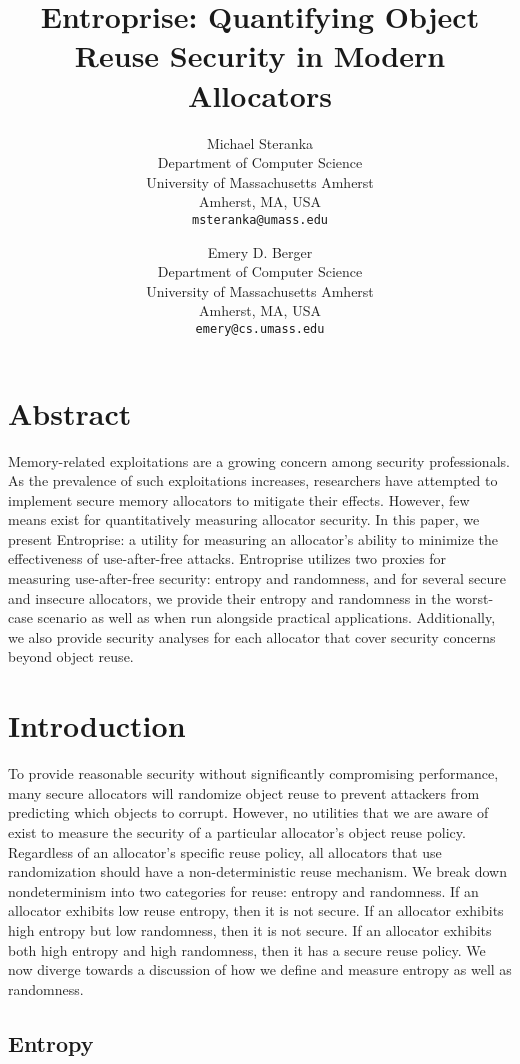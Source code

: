 \documentclass[11pt]{article}
\author{
    Michael Steranka\\
    Department of Computer Science\\
    University of Massachusetts Amherst\\
    Amherst, MA, USA\\
    \texttt{msteranka@umass.edu}
    \and
    Emery D. Berger\\
    Department of Computer Science\\
    University of Massachusetts Amherst\\
    Amherst, MA, USA\\
    \texttt{emery@cs.umass.edu}
}
\title{Entroprise: Quantifying Object Reuse Security in Modern Allocators}
\date{}
\begin{document}
\maketitle

\begin{multicols*}{2}

\section*{Abstract}

\noindent Memory-related exploitations are a growing concern among security professionals.
As the prevalence of such exploitations increases, researchers have attempted to implement
secure memory allocators to mitigate their effects.
However, few means exist for quantitatively measuring allocator security.
In this paper, we present Entroprise: a utility for measuring an allocator's ability to minimize the effectiveness of use-after-free attacks.
Entroprise utilizes two proxies for measuring use-after-free security: entropy and randomness, and for several secure and insecure allocators, we provide their entropy and randomness in the worst-case scenario as well as when run alongside practical applications.
Additionally, we also provide security analyses for each allocator that cover security concerns beyond object reuse.

\section{Introduction}

To provide reasonable security without significantly compromising performance, many secure allocators will randomize object reuse to prevent attackers from predicting which objects to corrupt.
However, no utilities that we are aware of exist to measure the security of a particular allocator's object reuse policy. 
Regardless of an allocator's specific reuse policy, all allocators that use randomization should have a non-deterministic reuse mechanism.
We break down nondeterminism into two categories for reuse: entropy and randomness.
If an allocator exhibits low reuse entropy, then it is not secure.
If an allocator exhibits high entropy but low randomness, then it is not secure.
If an allocator exhibits both high entropy and high randomness, then it has a secure reuse policy.
We now diverge towards a discussion of how we define and measure entropy as well as randomness.

\subsection{Entropy}


\end{multicols*}
\end{document}
